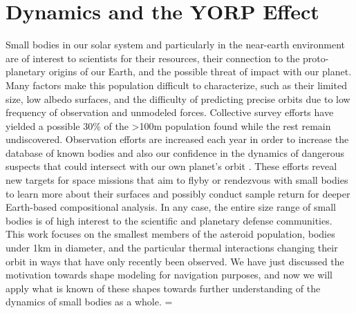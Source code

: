 \section{Dynamics and the YORP Effect}
Small bodies in our solar system and particularly in the near-earth environment are of interest to scientists for their resources, their connection to the proto-planetary origins of our Earth, and the possible threat of impact with our planet. Many factors make this population difficult to characterize, such as their limited size, low albedo surfaces, and the difficulty of predicting precise orbits due to low frequency of observation and unmodeled forces. Collective survey efforts have yielded a possible $30\%$ of the >100m population found while the rest remain undiscovered. Observation efforts are increased each year in order to increase the database of known bodies and also our confidence in the dynamics of dangerous suspects that could intersect with our own planet's orbit \cite{Jones2016}\cite{Mainzer2011}. These efforts reveal new targets for space missions that aim to flyby or rendezvous with small bodies to learn more about their surfaces and possibly conduct sample return for deeper Earth-based compositional analysis. In any case, the entire size range of small bodies is of high interest to the scientific and planetary defense communities. This work focuses on the smallest members of the asteroid population, bodies under 1km in diameter, and the particular thermal interactions changing their orbit in ways that have only recently been observed. We have just discussed the motivation towards shape modeling for navigation purposes, and now we will apply what is known of these shapes towards further understanding of the dynamics of small bodies as a whole. =

